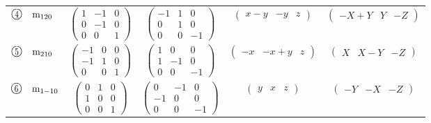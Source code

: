 \documentclass[fleqn,10pt,landscape]{jsarticle}
\begin{document}
\begin{center}
\begin{longtable}{lcccc}
$ {\ooalign{\hfil\resizebox{.8\width}{\height}{4}\hfil\crcr\raise.1ex\hbox{\large$\bigcirc$}}}\quad {\rm m}_{120} $ & $ \begin{pmatrix} 1 & -1 & 0 \\ 0 & -1 & 0 \\ 0 & 0 & 1 \end{pmatrix} $ & $ \begin{pmatrix} -1 & 1 & 0 \\ 0 & 1 & 0 \\ 0 & 0 & -1 \end{pmatrix} $ & $ \begin{pmatrix} x - y & - y & z \end{pmatrix} $ & $ \begin{pmatrix} - X + Y & Y & - Z \end{pmatrix} $ \\
$ {\ooalign{\hfil\resizebox{.8\width}{\height}{5}\hfil\crcr\raise.1ex\hbox{\large$\bigcirc$}}}\quad {\rm m}_{210} $ & $ \begin{pmatrix} -1 & 0 & 0 \\ -1 & 1 & 0 \\ 0 & 0 & 1 \end{pmatrix} $ & $ \begin{pmatrix} 1 & 0 & 0 \\ 1 & -1 & 0 \\ 0 & 0 & -1 \end{pmatrix} $ & $ \begin{pmatrix} - x & - x + y & z \end{pmatrix} $ & $ \begin{pmatrix} X & X - Y & - Z \end{pmatrix} $ \\
$ {\ooalign{\hfil\resizebox{.8\width}{\height}{6}\hfil\crcr\raise.1ex\hbox{\large$\bigcirc$}}}\quad {\rm m}_{1-10} $ & $ \begin{pmatrix} 0 & 1 & 0 \\ 1 & 0 & 0 \\ 0 & 0 & 1 \end{pmatrix} $ & $ \begin{pmatrix} 0 & -1 & 0 \\ -1 & 0 & 0 \\ 0 & 0 & -1 \end{pmatrix} $ & $ \begin{pmatrix} y & x & z \end{pmatrix} $ & $ \begin{pmatrix} - Y & - X & - Z \end{pmatrix} $ \\
\end{longtable}
\end{center}
\end{document}
